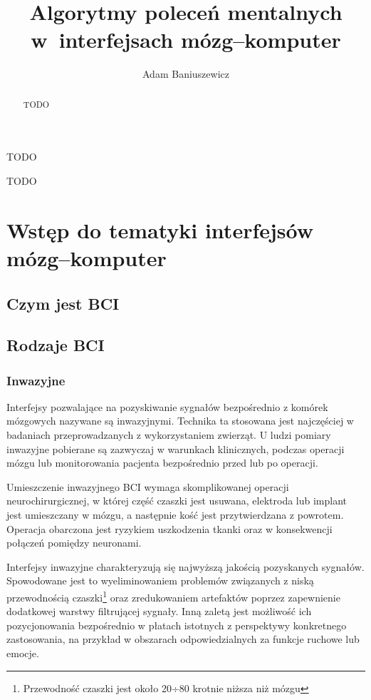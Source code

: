 \documentclass[skorowidz,skroty]{dyplomWEZUT}
\author{Adam Baniuszewicz}
\title{Algorytmy poleceń mentalnych w~interfejsach mózg--komputer}
\begin{document}
\begin{streszczenie}
TODO
\end{streszczenie}

\begin{abstract}
TODO
\end{abstract}

\maketitle

\begin{wprowadzenie}

TODO

\end{wprowadzenie}



\chapter{Wstęp do tematyki interfejsów mózg--komputer}
\section{Czym jest BCI}
\section{Rodzaje BCI}
\subsection{Inwazyjne}
Interfejsy pozwalające na pozyskiwanie sygnałów bezpośrednio z komórek mózgowych nazywane są inwazyjnymi. Technika ta stosowana jest najczęściej w badaniach przeprowadzanych z wykorzystaniem zwierząt\cite{bci_introduction}. U ludzi pomiary inwazyjne pobierane są zazwyczaj w warunkach klinicznych, podczas operacji mózgu lub monitorowania pacjenta bezpośrednio przed lub po operacji.

Umieszczenie inwazyjnego BCI wymaga skomplikowanej operacji neurochirurgicznej, w której część czaszki jest usuwana, elektroda lub implant jest umieszczany w mózgu, a następnie kość jest przytwierdzana z powrotem\cite{bci_introduction}. Operacja obarczona jest ryzykiem uszkodzenia tkanki oraz w konsekwencji połączeń pomiędzy neuronami\cite{bci_revolutionizing}.

Interfejsy inwazyjne charakteryzują się najwyższą jakością pozyskanych sygnałów. Spowodowane jest to wyeliminowaniem problemów związanych z niską przewodnością czaszki\footnote{Przewodność czaszki jest około 20÷80 krotnie niższa niż mózgu\cite{bci_technology}} oraz zredukowaniem artefaktów poprzez zapewnienie dodatkowej warstwy filtrującej sygnały. Inną zaletą jest możliwość ich pozycjonowania bezpośrednio w płatach istotnych z perspektywy konkretnego zastosowania, na przykład w obszarach odpowiedzialnych za funkcje ruchowe lub emocje.
\end{document}
